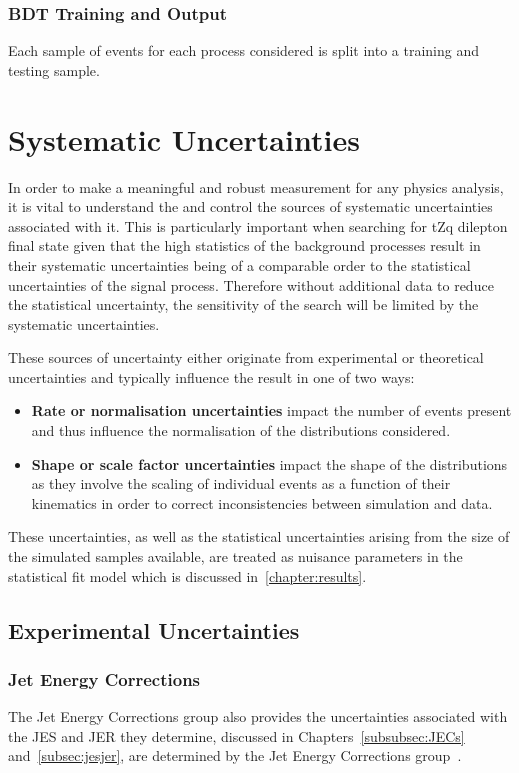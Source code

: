 
\subsection{BDT Training and Output}
Each sample of events for each process considered is split into a training and testing sample.


\chapter{Systematic Uncertainties}\label{chapter:systematics}
In order to make a meaningful and robust measurement for any physics analysis, it is vital to understand the and control the sources of systematic uncertainties associated with it.
This is particularly important when searching for tZq dilepton final state given that the high statistics of the background processes result in their systematic uncertainties being of a comparable order to the statistical uncertainties of the signal process.
Therefore without additional data to reduce the statistical uncertainty, the sensitivity of the search will be limited by the systematic uncertainties.

These sources of uncertainty either originate from experimental or theoretical uncertainties and typically influence the result in one of two ways:
\begin{itemize}
\item \textbf{Rate or normalisation uncertainties} impact the number of events present and thus influence the  normalisation of the distributions considered.
\item \textbf{Shape or scale factor uncertainties} impact the shape of the distributions as they involve the scaling of individual events as a function of their kinematics in order to correct inconsistencies between simulation and data.
\end{itemize}

These uncertainties, as well as the statistical uncertainties arising from the size of the simulated samples available, are treated as nuisance parameters in the statistical fit model which is discussed in~\ref{chapter:results}.

\section{Experimental Uncertainties}
\subsection{Jet Energy Corrections}
The Jet Energy Corrections group also provides the uncertainties associated with the JES and JER they determine, discussed in Chapters~\ref{subsubsec:JECs} and~\ref{subsec:jesjer}, are determined by the Jet Energy Corrections group~\cite{Khachatryan:2016kdb}. 

